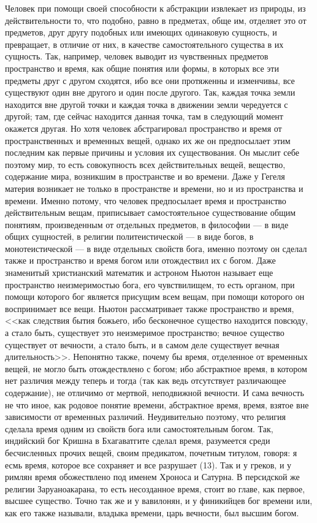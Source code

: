 \documentclass[12pt]{article}
\begin{document}
Человек при помощи своей способности к абстракции извлекает из природы, из действительности то, что подобно, равно в предметах, обще им, отделяет это от предметов, друг другу подобных или имеющих одинаковую сущность, и превращает, в отличие от них, в качестве самостоятельного существа в их сущность. Так, например, человек выводит из чувственных предметов пространство и время, как общие понятия или формы, в которых все эти предметы друг с другом сходятся, ибо все они протяженны и изменчивы, все существуют один вне другого и один после другого. Так, каждая точка земли находится вне другой точки и каждая точка в движении земли чередуется с другой; там, где сейчас находится данная точка, там в следующий момент окажется другая. Но хотя человек абстрагировал пространство и время от пространственных и временных вещей, однако их же он предпосылает этим последним как первые причины и условия их существования. Он мыслит себе поэтому мир, то есть совокупность всех действительных вещей, вещество, содержание мира, возникшим в пространстве и во времени. Даже у Гегеля материя возникает не только в пространстве и времени, но и из пространства и времени. Именно потому, что человек предпосылает время и пространство действительным вещам, приписывает самостоятельное существование общим понятиям, произведенным от отдельных предметов, в философии --- в виде общих сущностей, в религии политеистической --- в виде богов, в монотеистической --- в виде отдельных свойств бога, именно поэтому он сделал также и пространство и время богом или отождествил их с богом. Даже знаменитый христианский математик и астроном Ньютон называет еще пространство неизмеримостью бога, его чувствилищем, то есть органом, при помощи которого бог является присущим всем вещам, при помощи которого он воспринимает все вещи. Ньютон рассматривает также пространство и время, <<как следствия бытия божьего, ибо бесконечное существо находится повсюду, а стало быть, существует это неизмеримое пространство; вечное существо существует от вечности, а стало быть, и в самом деле существует вечная длительность>>. Непонятно также, почему бы время, отделенное от временных вещей, не могло быть отождествлено с богом; ибо абстрактное время, в котором нет различия между теперь и тогда (так как ведь отсутствует различающее содержание), не отличимо от мертвой, неподвижной вечности. И сама вечность не что иное, как родовое понятие времени, абстрактное время, время, взятое вне зависимости от временных различий. Неудивительно поэтому, что религия сделала время одним из свойств бога или самостоятельным богом. Так, индийский бог Кришна в Бхагаватгите сделал время, разумеется среди бесчисленных прочих вещей, своим предикатом, почетным титулом, говоря: я есмь время, которое все сохраняет и все разрушает (13). Так и у греков, и у римлян время обожествлено под именем Хроноса и Сатурна. В персидской же религии Заруаноакарана, то есть несозданное время, стоит во главе, как первое, высшее существо. Точно так же и у вавилонян, и у финикийцев бог времени или, как его также называли, владыка времени, царь вечности, был высшим богом. 
\end{document}
